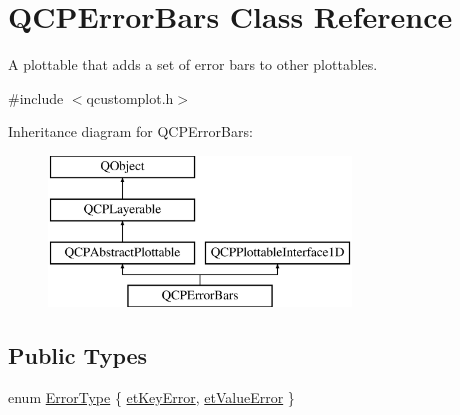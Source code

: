 \hypertarget{class_q_c_p_error_bars}{}\section{Q\+C\+P\+Error\+Bars Class Reference}
\label{class_q_c_p_error_bars}


A plottable that adds a set of error bars to other plottables.  




{\ttfamily \#include $<$qcustomplot.\+h$>$}

Inheritance diagram for Q\+C\+P\+Error\+Bars\+:\begin{figure}[H]
\begin{center}
\leavevmode
\includegraphics[height=4.000000cm]{d8/d0b/class_q_c_p_error_bars}
\end{center}
\end{figure}
\subsection*{Public Types}
\begin{DoxyCompactItemize}
\item 
enum \mbox{\hyperlink{class_q_c_p_error_bars_a95f0220f11a72648b96480a85ce26474}{Error\+Type}} \{ \mbox{\hyperlink{class_q_c_p_error_bars_a95f0220f11a72648b96480a85ce26474a9fca24d20d5376e41be216fc9b08cd21}{et\+Key\+Error}}, 
\mbox{\hyperlink{class_q_c_p_error_bars_a95f0220f11a72648b96480a85ce26474a5f760fc9c0a98c7f1e93e33bf54e9d83}{et\+Value\+Error}}
 \}
\end{DoxyCompactItemize}
